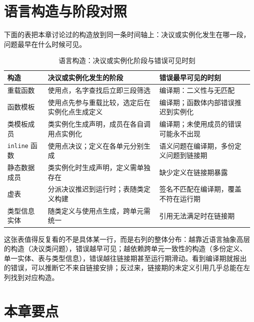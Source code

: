 \documentclass[12pt,a4paper,fontset=fandol]{ctexbook}
\newcommand{\Tp}[1]{\texttt{#1}}
\begin{document}
\section{语言构造与阶段对照}\label{sec:cl03-matrix}

下面的表把本章讨论过的构造放到同一条时间轴上：决议或实例化发生在哪一段，问题最早在什么时候可见。

\begin{table}[htbp]
\centering
\caption{语言构造：决议或实例化阶段与错误可见时刻}
\label{tab:cl03-matrix}
\begin{tabularx}{0.96\textwidth}{>{\raggedright\arraybackslash}p{} >{\raggedright\arraybackslash}p{} X}
\toprule
构造 & 决议或实例化发生的阶段 & 错误最早可见的时刻 \\
\midrule
重载函数 & 使用点，名字查找后立即三段筛选 & 编译期：二义性与无匹配 \\
函数模板 & 使用点先参与重载比较，选定后在实例化点生成定义 & 编译期；函数体内部错误推迟到实例化 \\
类模板成员 & 类实例化生成声明，成员在各自调用点实例化 & 编译期；未使用成员的错误可能永不出现 \\
\Tp{inline} 函数 & 使用点决议；定义在各单元分别生成 & 语义问题在编译期，多份定义问题到链接期 \\
静态数据成员 & 类实例化时生成声明，定义需单独存在 & 缺少定义在链接期暴露 \\
虚表 & 分派决议推迟到运行时；表随类定义构建 & 签名不匹配在编译期，覆盖不符在运行期 \\
类型信息实体 & 随类定义与使用点生成，跨单元需统一 & 引用无法满足时在链接期 \\
\bottomrule
\end{tabularx}
\end{table}

这张表值得反复看的不是具体某一行，而是右列的整体分布：越靠近语言抽象高层的构造（决议类问题），错误越早可见；越依赖跨单元一致性的构造（多份定义、单一实体、表与类型信息），错误越往链接期甚至运行期滑动。看到编译期就报出的错误，可以推断它不来自链接安排；反过来，链接期的未定义引用几乎总能在左列找到对应构造。

\section{本章要点}\label{sec:cl03-keypoints}
\end{document}
